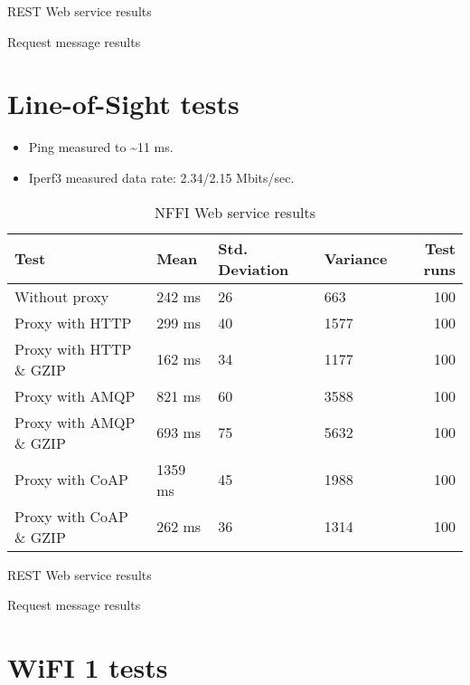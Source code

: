 \begin{appendices}
\begin{table}[H]

\caption{REST Web service results}
\end{table}

\begin{table}[H]

\caption{Request message results}
\end{table}


\section{Line-of-Sight tests}

\begin{itemize}
	\item Ping measured to \textasciitilde 11 ms.
	\item Iperf3 measured data rate: 2.34/2.15 Mbits/sec.
\end{itemize}

\begin{table}[H]
\begin{tabular}{llllr}
\hline
 Test                   &   Mean &   Std. Deviation &   Variance &   Test runs \\
\hline
  Without proxy & 242 ms & 26 & 663 & 100 \\
  Proxy with HTTP & 299 ms & 40 & 1577 & 100 \\
  Proxy with HTTP \& GZIP & 162 ms & 34 & 1177 & 100 \\
  Proxy with AMQP & 821 ms & 60 & 3588 & 100 \\
  Proxy with AMQP \& GZIP & 693 ms & 75 & 5632 & 100\\
  Proxy with CoAP & 1359 ms & 45 & 1988 & 100 \\
  Proxy with CoAP \& GZIP & 262 ms & 36 & 1314 & 100 \\
\end{tabular}
\caption{NFFI Web service results}
\end{table}


\begin{table}[H]

\caption{REST Web service results}
\end{table}

\begin{table}[H]

\caption{Request message results}
\end{table}


\section{WiFI 1 tests}


\end{appendices}
